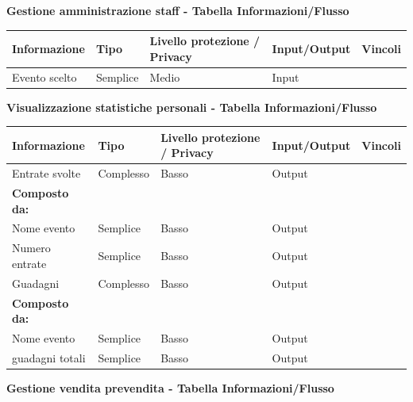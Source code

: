 \documentclass[a4paper]{article}
\begin{document}
\textbf{Gestione amministrazione staff  - Tabella Informazioni/Flusso}

\begin{center}
    \begin{tabularx}{1\textwidth}{|X|l|X|X|X|}
        \hline
        \textbf{Informazione} &\textbf{Tipo} & \textbf{Livello protezione / Privacy} & \textbf{Input/Output} & \textbf{Vincoli}\\
        \hline
        \hline
        Evento scelto & Semplice & Medio & Input & \\
        \hline
    \end{tabularx}
\end{center}

\textbf{Visualizzazione statistiche personali  - Tabella Informazioni/Flusso}

\begin{center}
    \begin{tabularx}{1\textwidth}{|X|l|X|X|X|}
        \hline
        \textbf{Informazione} &\textbf{Tipo} & \textbf{Livello protezione / Privacy} & \textbf{Input/Output} & \textbf{Vincoli}\\
        \hline
        \hline
        Entrate svolte & Complesso & Basso & Output & \\
        \textbf{Composto da:} & & & & \\
        Nome evento & Semplice & Basso & Output & \\
        Numero entrate & Semplice & Basso & Output & \\
        \hline
        Guadagni & Complesso & Basso & Output & \\
        \textbf{Composto da:} & & & & \\
        Nome evento & Semplice & Basso & Output & \\
        guadagni totali & Semplice & Basso & Output & \\
        \hline
    \end{tabularx}
\end{center}

\textbf{Gestione vendita prevendita  - Tabella Informazioni/Flusso}
\end{document}
